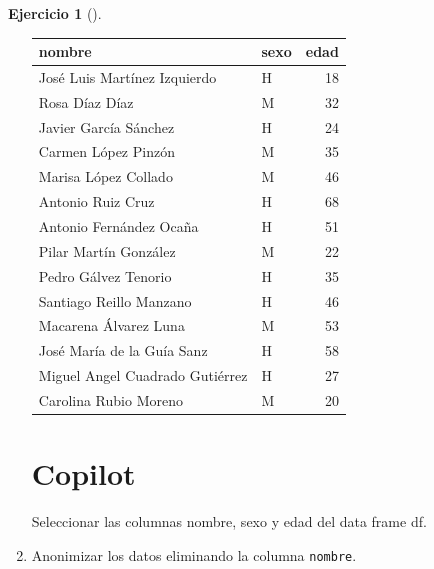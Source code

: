 \documentclass[
  a4paper,
]{scrreport}
\newenvironment{Shaded}{\begin{snugshade}}{\end{snugshade}}
\newcommand{\ExtensionTok}[1]{\textcolor[rgb]{0.00,0.23,0.31}{#1}}
\newcommand{\NormalTok}[1]{\textcolor[rgb]{0.00,0.23,0.31}{#1}}
\theoremstyle{definition}
\newtheorem{exercise}{Ejercicio}[chapter]
\theoremstyle{remark}
\begin{document}
\begin{exercise}[]
\begin{enumerate}
\begin{tcolorbox}
  \begin{longtable}[]{@{}llr@{}}
  \toprule\noalign{}
  nombre & sexo & edad \\
  \midrule\noalign{}
  \endhead
  \bottomrule\noalign{}
  \endlastfoot
  José Luis Martínez Izquierdo & H & 18 \\
  Rosa Díaz Díaz & M & 32 \\
  Javier García Sánchez & H & 24 \\
  Carmen López Pinzón & M & 35 \\
  Marisa López Collado & M & 46 \\
  Antonio Ruiz Cruz & H & 68 \\
  Antonio Fernández Ocaña & H & 51 \\
  Pilar Martín González & M & 22 \\
  Pedro Gálvez Tenorio & H & 35 \\
  Santiago Reillo Manzano & H & 46 \\
  Macarena Álvarez Luna & M & 53 \\
  José María de la Guía Sanz & H & 58 \\
  Miguel Angel Cuadrado Gutiérrez & H & 27 \\
  Carolina Rubio Moreno & M & 20 \\
  \end{longtable}

  \section{Copilot}

\begin{Shaded}
\begin{Highlighting}[]
\ExtensionTok{Seleccionar}\NormalTok{ las columnas nombre, sexo y edad del data frame df.}
\end{Highlighting}
\end{Shaded}

  \end{tcolorbox}
\item
  Anonimizar los datos eliminando la columna \texttt{nombre}.

  \begin{tcolorbox}[enhanced jigsaw, colframe=quarto-callout-tip-color-frame, toprule=.15mm, bottomtitle=1mm, breakable, opacitybacktitle=0.6, toptitle=1mm, colback=white, bottomrule=.15mm, title=\textcolor{quarto-callout-tip-color}{\faLightbulb}\hspace{0.5em}{Solución}, arc=.35mm, left=2mm, titlerule=0mm, rightrule=.15mm, coltitle=black, leftrule=.75mm, opacityback=0, colbacktitle=quarto-callout-tip-color!10!white]


\end{tcolorbox}
\end{enumerate}
\end{exercise}
\end{document}
